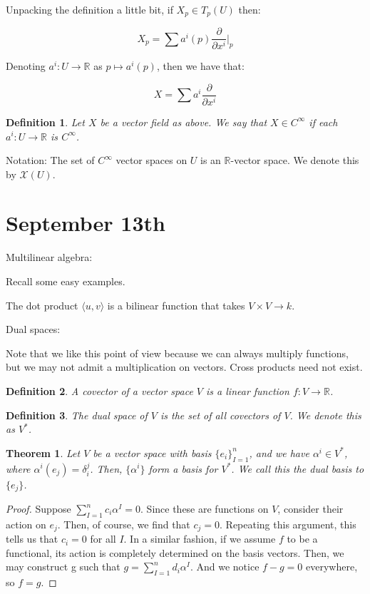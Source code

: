\documentclass[10pt]{article}
\newtheorem{definition}{Definition}[section]
\newtheorem{theorem}{Theorem}[section]
\begin{document}
Unpacking the definition a little bit, if $X_p \in T_p(U)$ then:

$$ X_p = \sum a^i(p) \frac{\partial}{\partial x^i} \bigg|_p$$

Denoting $a^i: U \to \mathbb{R}$ as $p \mapsto a^i(p)$, then we have that:

$$ X = \sum a^i \frac{\partial}{\partial x^i}$$

\begin{definition}
Let $X$ be a vector field as above. We say that $X \in C^\infty$ if each $a^i: U \to \mathbb{R}$ is $C^\infty$.
\end{definition}

Notation: The set of $C^\infty$ vector spaces on $U$ is an $\mathbb{R}$-vector space. We denote this by $\mathcal{X}(U)$.

\section{September 13th}

Multilinear algebra:

Recall some easy examples.

The dot product $\langle u, v \rangle$ is a bilinear function that takes $V \times V \to k$.

Dual spaces:

Note that we like this point of view because we can always multiply functions, but we may not admit a multiplication on vectors. Cross products need not exist.

\begin{definition}
A covector of a vector space $V$ is a linear function $f: V \to \mathbb{R}$.
\end{definition}

\begin{definition}
The dual space of $V$ is the set of all covectors of $V$. We denote this as $V^*$.
\end{definition}

\begin{theorem}
Let $V$ be a vector space with basis $\{ e_i \}_{I=1}^n$, and we have $\alpha^i \in V^*$, where $\alpha^i(e_j) = \delta_i^j$. Then, $\{ \alpha^i \}$ form a basis for $V^*$. We call this the dual basis to $\{ e_j \}$.
\end{theorem}

\begin{proof}
Suppose $\sum_{I=1}^n c_i \alpha^I = 0$. Since these are functions on $V$, consider their action on $e_j$. Then, of course, we find that $c_j = 0$. Repeating this argument, this tells us that $c_i = 0$ for all $I$. In a similar fashion, if we assume $f$ to be a functional, its action is completely determined on the basis vectors. Then, we may construct g such that $g = \sum_{I=1}^n d_i \alpha^I$. And we notice $f-g = 0$ everywhere, so $f = g$.
\end{proof}
\end{document}
